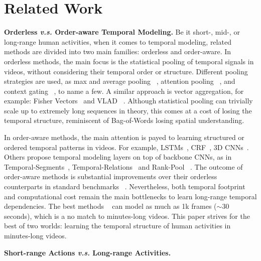 \documentclass[10pt,twocolumn,letterpaper]{article}
\newcommand{\partitle}[1]{\noindent\textbf{#1}}
\newcommand{\ptspace}{\vspace*{5pt}}
\begin{document}
\section{Related Work}\label{sec:related_work}
\ptspace
\partitle{Orderless \textit{v.s.} Order-aware Temporal Modeling.}
Be it short-, mid-, or long-range human activities, when it comes to temporal modeling, related methods are divided into two main families: orderless and order-aware.
In orderless methods, the main focus is the statistical pooling of temporal signals in videos, without considering their temporal order or structure.
Different pooling strategies are used, as max and average pooling ~\cite{hussein2017unified}, attention pooling ~\cite{girdhar2017attentional}, and context gating ~\cite{miech2017learnable}, to name a few.
A similar approach is vector aggregation, for example: Fisher Vectors~\cite{oneata2013action} and VLAD ~\cite{duta2017spatio, girdhar2017actionvlad}.
Although statistical pooling can trivially scale up to extremely long sequences in theory, this comes at a cost of losing the temporal structure, reminiscent of Bag-of-Words losing spatial understanding.

In order-aware methods, the main attention is payed to learning structured or ordered temporal patterns in videos.
For example, LSTMs~\cite{li2017concurrent, donahue2015long}, CRF~\cite{sigurdsson2017asynchronous}, 3D CNNs~\cite{xu2017r, carreira2017quo, tran2018closer, xie2017rethinking, wang2017non}.
Others propose temporal modeling layers on top of backbone CNNs, as in Temporal-Segments~\cite{wang2016temporal}, Temporal-Relations~\cite{zhou2017temporal} and Rank-Pool ~\cite{fernando2017rank}.
The outcome of order-aware methods is substantial improvements over their orderless counterparts in standard benchmarks ~\cite{kay2017kinetics, kuehne2011hmdb, soomro2012ucf101}.
Nevertheless, both temporal footprint and computational cost remain the main bottlenecks to learn long-range temporal dependencies.
The best methods ~\cite{hussein2018timeception, wang2017non} can model as much as 1k frames ($\sim$30 seconds), which is a no match to minutes-long videos.
This paper strives for the best of two worlds: learning the temporal structure of human activities in minutes-long videos.

\ptspace
\partitle{Short-range Actions \textit{v.s.} Long-range Activities.}
\end{document}
